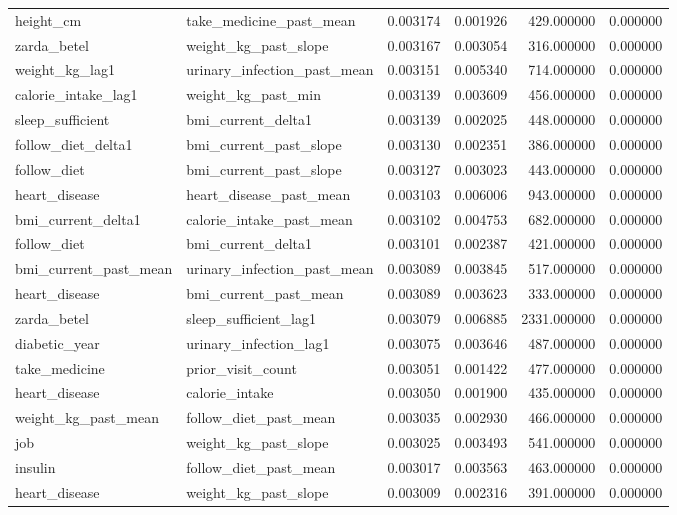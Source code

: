 \begin{longtable}{llrrrr}
height\_cm & take\_medicine\_past\_mean & 0.003174 & 0.001926 & 429.000000 & 0.000000 \\
zarda\_betel & weight\_kg\_past\_slope & 0.003167 & 0.003054 & 316.000000 & 0.000000 \\
weight\_kg\_lag1 & urinary\_infection\_past\_mean & 0.003151 & 0.005340 & 714.000000 & 0.000000 \\
calorie\_intake\_lag1 & weight\_kg\_past\_min & 0.003139 & 0.003609 & 456.000000 & 0.000000 \\
sleep\_sufficient & bmi\_current\_delta1 & 0.003139 & 0.002025 & 448.000000 & 0.000000 \\
follow\_diet\_delta1 & bmi\_current\_past\_slope & 0.003130 & 0.002351 & 386.000000 & 0.000000 \\
follow\_diet & bmi\_current\_past\_slope & 0.003127 & 0.003023 & 443.000000 & 0.000000 \\
heart\_disease & heart\_disease\_past\_mean & 0.003103 & 0.006006 & 943.000000 & 0.000000 \\
bmi\_current\_delta1 & calorie\_intake\_past\_mean & 0.003102 & 0.004753 & 682.000000 & 0.000000 \\
follow\_diet & bmi\_current\_delta1 & 0.003101 & 0.002387 & 421.000000 & 0.000000 \\
bmi\_current\_past\_mean & urinary\_infection\_past\_mean & 0.003089 & 0.003845 & 517.000000 & 0.000000 \\
heart\_disease & bmi\_current\_past\_mean & 0.003089 & 0.003623 & 333.000000 & 0.000000 \\
zarda\_betel & sleep\_sufficient\_lag1 & 0.003079 & 0.006885 & 2331.000000 & 0.000000 \\
diabetic\_year & urinary\_infection\_lag1 & 0.003075 & 0.003646 & 487.000000 & 0.000000 \\
take\_medicine & prior\_visit\_count & 0.003051 & 0.001422 & 477.000000 & 0.000000 \\
heart\_disease & calorie\_intake & 0.003050 & 0.001900 & 435.000000 & 0.000000 \\
weight\_kg\_past\_mean & follow\_diet\_past\_mean & 0.003035 & 0.002930 & 466.000000 & 0.000000 \\
job & weight\_kg\_past\_slope & 0.003025 & 0.003493 & 541.000000 & 0.000000 \\
insulin & follow\_diet\_past\_mean & 0.003017 & 0.003563 & 463.000000 & 0.000000 \\
heart\_disease & weight\_kg\_past\_slope & 0.003009 & 0.002316 & 391.000000 & 0.000000 \\

\end{longtable}
